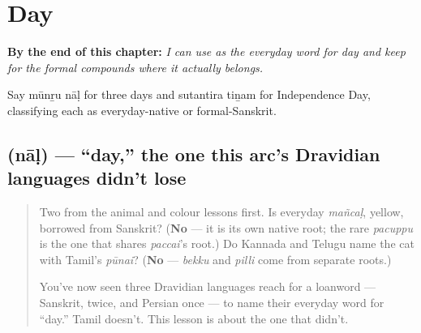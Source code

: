 
\chapter{Day}
\label{ch:ta-day}

\begin{chapteropening}
\textbf{By the end of this chapter:} \emph{I can use  as the everyday word for day and keep  for the formal compounds where it actually belongs.}

Say mūnṟu nāḷ for three days and sutantira tiṉam for Independence Day, classifying each as everyday-native or formal-Sanskrit.
\end{chapteropening}

\section[\texorpdfstring{\ta{நாள்} (nāḷ)}{நாள் (nāḷ)}]{ (nāḷ) — \textquotedblleft{}day,\textquotedblright{} the one this arc's Dravidian languages didn't lose}

\label{lesson:TA-C23-naal}



\begin{quote}
Two from the animal and colour lessons first. Is everyday \emph{mañcaḷ}, yellow, borrowed from Sanskrit? (\textbf{No} — it is its own native root; the rare \emph{pacuppu} is the one that shares \emph{paccai}'s root.) Do Kannada and Telugu name the cat with Tamil's \emph{pūnai}? (\textbf{No} — \emph{bekku} and \emph{pilli} come from separate roots.)

You've now seen three Dravidian languages reach for a loanword — Sanskrit, twice, and Persian once — to name their everyday word for \textquotedblleft{}day.\textquotedblright{} Tamil doesn't. This lesson is about the one that didn't.
\end{quote}

